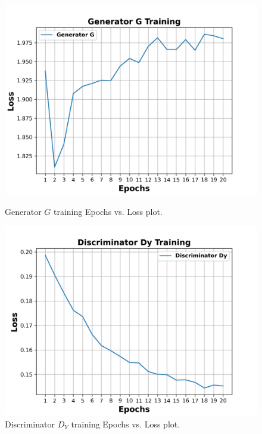 \begin{figure}[H]
  \centering
  \begin{minipage}[b]{0.49\textwidth}
    \includegraphics[width=\textwidth]{images/Evaluation/GeneratorGTraining.png}
    \caption[Generator $G$ training Epochs vs. Loss plot.]{Generator $G$ training Epochs vs. Loss plot.}
    \label{fig:generatorG}
  \end{minipage}
  \hfill
  \begin{minipage}[b]{0.49\textwidth}
    \includegraphics[width=\textwidth]{images/Evaluation/DiscriminatorDyTraining.png}
    \caption[Discriminator $D_Y$ training Epochs vs. Loss plot.]{Discriminator $D_Y$ training Epochs vs. Loss plot.}
    \label{fig:discriminatorDy}
  \end{minipage}
\end{figure}

